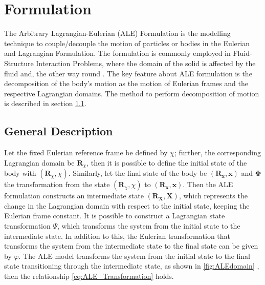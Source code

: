 \chapter{Formulation}
The Arbitrary Lagrangian-Eulerian (ALE) Formulation is the modelling technique to couple/decouple the motion of particles or bodies in the Eulerian and Lagrangian Formulation. The formulation is commonly employed in Fluid-Structure Interaction Problems, where the domain of the solid is affected by the fluid and, the other way round \cite{ALE_FSI}. The key feature about ALE formulation is the decomposition of the body's motion as the motion of Eulerian frames and the respective Lagrangian domains. The method to perform decomposition of motion is described in section \ref{ALE_Description}.
\section{General Description}
\label{ALE_Description}
Let the fixed Eulerian reference frame be defined by $\chi$; further, the corresponding Lagrangian domain be $\mathbf{R}_{\chi}$, then it is possible to define the initial state of the body with $(\mathbf{R}_{\chi}, \chi)$. Similarly, let the final state of the body be $(\mathbf{R}_{\mathbf{x}}, \mathbf{x})$ and $\boldsymbol{\Phi}$ the transformation from the state $(\mathbf{R}_{\chi}, \chi)$ to $(\mathbf{R}_{\mathbf{x}}, \mathbf{x})$. Then the ALE formulation constructs an intermediate state $(\mathbf{R}_{\mathbf{X}}, \mathbf{X})$, which represents the change in the Lagrangian domain with respect to the initial state, keeping the Eulerian frame constant. It is possible to construct a Lagrangian state transformation $\Psi$, which transforms the system from the initial state to the intermediate state. In addition to this, the Eulerian transformation that transforms the system from the intermediate state to the final state can be given by $\varphi$. The ALE model transforms the system from the initial state to the final state transitioning through the intermediate state, as shown in \autoref{fig:ALEdomain} \cite{ALE}, then the relationship \autoref{eq:ALE_Transformation} holds.
